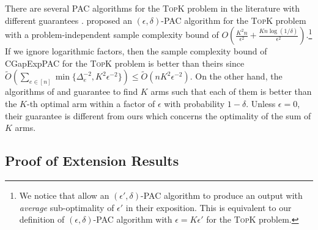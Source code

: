\documentclass{article}
\newcommand{\AlgorithmPAC}{{\small \textsf{CGapExpPAC}}\xspace}
\newcommand{\MultiIdent}{\textsc{TopK}\xspace}
\begin{document}
There are several PAC algorithms for the \MultiIdent problem in the literature with different guarantees \citep{kalyanakrishnan2012pac,zhou2014optimal,gabillon2012best}.
\citet{zhou2014optimal} proposed an $(\epsilon,\delta)$-PAC algorithm for the \MultiIdent problem with a problem-independent sample complexity bound of $O(\frac{K^2n}{\epsilon^2}+\frac{Kn\log(1/\delta)}{\epsilon^2})$.\footnote{We notice that \citet{zhou2014optimal} allow an $(\epsilon',\delta)$-PAC algorithm to produce an output with \emph{average} sub-optimality of $\epsilon'$ in their exposition. This is equivalent to our definition of $(\epsilon,\delta)$-PAC algorithm with $\epsilon=K\epsilon'$ for the \MultiIdent problem.}
If we ignore logarithmic factors, then the sample complexity bound of \AlgorithmPAC for the \MultiIdent problem is better than theirs since $\tilde O(\sum_{e\in[n]}\min\{\Delta_e^{-2}, K^2\epsilon^{-2}\}) \le  \tilde O(nK^2\epsilon^{-2})$.
On the other hand, the algorithms of \citet{kalyanakrishnan2012pac} and \citet{gabillon2012best} guarantee to find $K$ arms such that each of them is better than the $K$-th optimal arm within a factor of $\epsilon$ with probability $1-\delta$.
Unless $\epsilon=0$, their guarantee is different from ours which concerns the optimality of the sum of $K$ arms.





\subsection{Proof of Extension Results}
\end{document}
